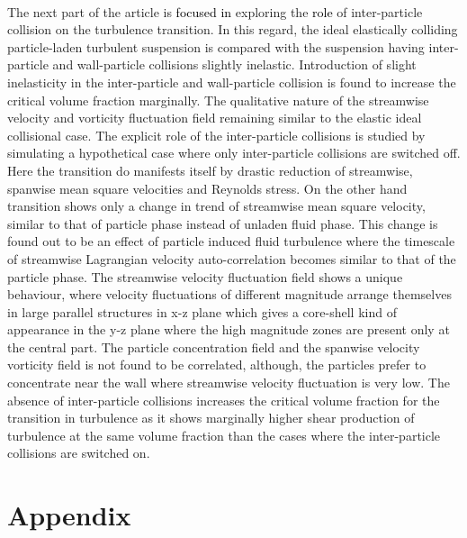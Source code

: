 \documentclass[aip,graphicx]{revtex4-1}
\begin{document}
\\ The next part of the article is \textcolor{black}{focused in} exploring the \textcolor{black}{role} of inter-particle collision on the turbulence transition. In this regard, the ideal elastically colliding particle-laden turbulent suspension is compared with the suspension having inter-particle and wall-particle collisions slightly inelastic. Introduction of slight inelasticity in the inter-particle and wall-particle collision is found to increase the critical volume fraction marginally. The qualitative nature of the streamwise velocity and vorticity fluctuation field remaining similar to the elastic ideal collisional case. The explicit role of the inter-particle collisions is studied by simulating a hypothetical case where only inter-particle collisions are switched off. Here the transition do manifests itself by drastic reduction of streamwise, spanwise mean square velocities and Reynolds stress. On the other hand transition shows only a change in trend of streamwise mean square velocity, similar to that of particle phase instead of unladen fluid phase. This change is found out to be an effect of particle induced fluid turbulence where the timescale of streamwise Lagrangian velocity auto-correlation becomes similar to that of the particle phase. The streamwise velocity fluctuation field shows a unique behaviour, where velocity fluctuations of different magnitude arrange themselves in large parallel structures in x-z plane which gives a core-shell kind of appearance in the y-z plane where the high magnitude zones are present only at the central part. The particle concentration field and the spanwise velocity vorticity field is not found to be correlated, although, the particles prefer to concentrate near the wall where streamwise velocity fluctuation is very low. The absence of inter-particle collisions increases the critical volume fraction for the transition in turbulence as it shows marginally higher shear production of turbulence at the same volume fraction than the cases where the inter-particle collisions are switched on.

\clearpage
	\section{Appendix}
\end{document}
